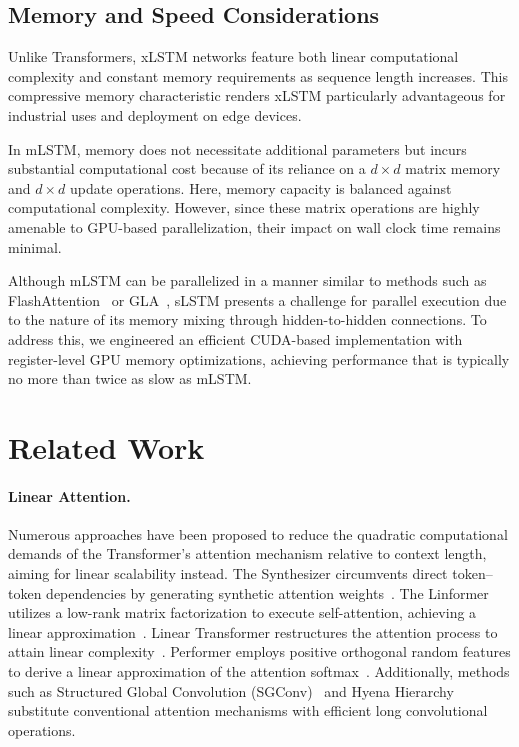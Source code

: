 \subsection{Memory and Speed Considerations}

Unlike Transformers, xLSTM networks feature both linear computational complexity and constant memory requirements as sequence length increases. This compressive memory characteristic renders xLSTM particularly advantageous for industrial uses and deployment on edge devices.

In mLSTM, memory does not necessitate additional parameters but incurs substantial computational cost because of its reliance on a $d \times d$ matrix memory and $d \times d$ update operations. Here, memory capacity is balanced against computational complexity. However, since these matrix operations are highly amenable to GPU-based parallelization, their impact on wall clock time remains minimal.

Although mLSTM can be parallelized in a manner similar to methods such as FlashAttention~\citep{Dao:22,Dao:23} or GLA~\citep{Yang:23arxiv}, sLSTM presents a challenge for parallel execution due to the nature of its memory mixing through hidden-to-hidden connections. To address this, we engineered an efficient CUDA-based implementation with register-level GPU memory optimizations, achieving performance that is typically no more than twice as slow as mLSTM.

\section{Related Work}
\label{sec:related}

\paragraph{Linear Attention.} Numerous approaches have been proposed to reduce the quadratic computational demands of the Transformer's attention mechanism relative to context length, aiming for linear scalability instead. The Synthesizer circumvents direct token--token dependencies by generating synthetic attention weights~\citep{Tay:20arxiv}. The Linformer utilizes a low-rank matrix factorization to execute self-attention, achieving a linear approximation~\citep{Wang:20arxiv}. Linear Transformer restructures the attention process to attain linear complexity~\citep{Katharopoulos:20}. Performer employs positive orthogonal random features to derive a linear approximation of the attention softmax~\citep{Choromanski:21}. Additionally, methods such as Structured Global Convolution (SGConv)~\citep{Li:22} and Hyena Hierarchy~\citep{Poli:23} substitute conventional attention mechanisms with efficient long convolutional operations.

